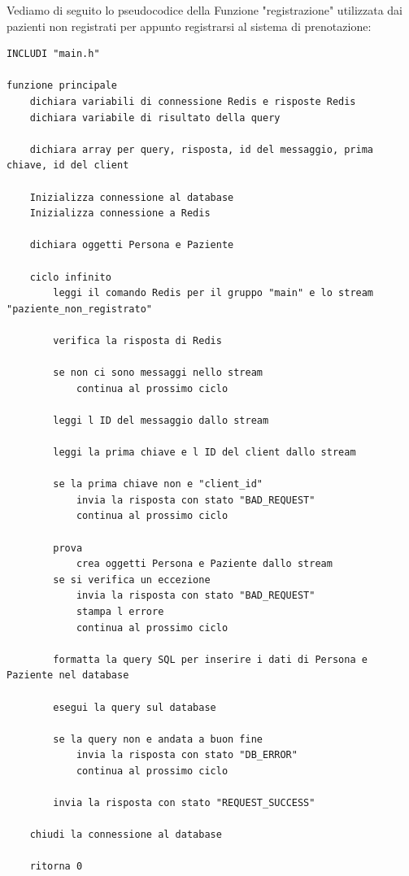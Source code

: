 \documentclass[12pt]{report}
\begin{document}
    Vediamo di seguito lo pseudocodice della Funzione "registrazione" utilizzata dai pazienti non registrati per appunto registrarsi al sistema di prenotazione:
    \begin{lstlisting}
INCLUDI "main.h"

funzione principale
    dichiara variabili di connessione Redis e risposte Redis
    dichiara variabile di risultato della query

    dichiara array per query, risposta, id del messaggio, prima chiave, id del client

    Inizializza connessione al database
    Inizializza connessione a Redis

    dichiara oggetti Persona e Paziente

    ciclo infinito
        leggi il comando Redis per il gruppo "main" e lo stream "paziente_non_registrato"
        
        verifica la risposta di Redis
        
        se non ci sono messaggi nello stream
            continua al prossimo ciclo

        leggi l ID del messaggio dallo stream

        leggi la prima chiave e l ID del client dallo stream

        se la prima chiave non e "client_id"
            invia la risposta con stato "BAD_REQUEST"
            continua al prossimo ciclo

        prova
            crea oggetti Persona e Paziente dallo stream
        se si verifica un eccezione
            invia la risposta con stato "BAD_REQUEST"
            stampa l errore
            continua al prossimo ciclo

        formatta la query SQL per inserire i dati di Persona e Paziente nel database

        esegui la query sul database

        se la query non e andata a buon fine
            invia la risposta con stato "DB_ERROR"
            continua al prossimo ciclo

        invia la risposta con stato "REQUEST_SUCCESS"

    chiudi la connessione al database

    ritorna 0

    \end{lstlisting}
    
\end{document}
